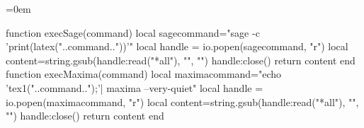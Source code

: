 \documentclass[a4paper]{ltjsarticle}
\begin{document}
\AMCcodeVspace=0em

\begin{luacode*}
function execSage(command)
  local sagecommand="sage -c 'print(latex("..command.."))'"
  local handle = io.popen(sagecommand, "r")
  local content=string.gsub(handle:read("*all"), "\n", "")
  handle:close()
  return content
end
function execMaxima(command)
  local maximacommand="echo 'tex1("..command..");'| maxima --very-quiet"
  local handle = io.popen(maximacommand, "r")
  local content=string.gsub(handle:read("*all"), "\n", "")
  handle:close()
  return content
end
\end{luacode*}

\end{document}
